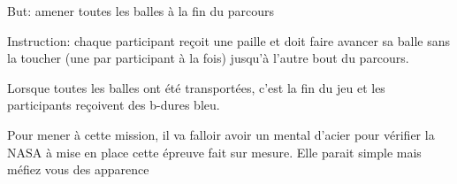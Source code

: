 \documentclass{grand-jeu}
\begin{document}
\begin{liste-materiel}
\end{liste-materiel}

\begin{regles}
But: amener toutes les balles à la fin du parcours

\vspace{0.2cm}

Instruction: chaque participant reçoit une paille et doit faire avancer sa balle sans la toucher (une par participant à la fois) jusqu’à l’autre bout du parcours.

Lorsque toutes les balles ont été transportées, c’est la fin du jeu et les participants reçoivent des b-dures bleu. 
\end{regles}

\begin{imaginaire}
Pour mener à cette mission, il va falloir avoir un mental d'acier pour vérifier la NASA à mise en place cette épreuve fait sur mesure. Elle parait simple mais méfiez vous des apparence 
\end{imaginaire}

\begin{moments-stop}
\end{moments-stop}
\end{document}
